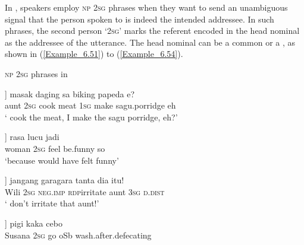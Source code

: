 
In , speakers employ \textsc{np} \textsc{2sg}  phrases when they want to send an unambiguous signal that the person spoken to is indeed the intended addressee. In such  phrases, the second person  ‘\textsc{2sg}’ marks the referent encoded in the head nominal as the addressee of the utterance. The head nominal can be a common  or a , as shown in (\ref{Example_6.51}) to (\ref{Example_6.54}).



\begin{styleExampleTitle}
\textsc{np} \textsc{2sg}  phrases in 
\end{styleExampleTitle}

\ea
\label{Example_6.51}
\gll {[\bluebold{mama-ade}} {]} {masak} {daging} {sa} {biking} {papeda} {e?}\\ %
 aunt  \textsc{2sg}  cook  meat  \textsc{1sg}  make  sagu.porridge  eh\\

\glt
‘ cook the meat, I make the sagu porridge, eh?’ \textstyleExampleSource{[080921-001-CvNP.0073]}
\z

\ea
\label{Example_6.52}
\gll {[\bluebold{mace}} {]} {rasa} {lucu} {jadi}\\ %
 woman  \textsc{2sg}  feel  be.funny  so\\

 ‘because  would have felt funny’ \textstyleExampleSource{[081010-001-Cv.0206]}
\z

\ea
\label{Example_6.53}
\gll {[\bluebold{Wili}} {]} {jangang} {gara{\Tilde}gara} {tanta} {dia} {itu}!\\ %
 Wili  \textsc{2sg}  \textsc{neg.imp}  \textsc{rdp}{\Tilde}irritate  aunt  \textsc{3sg}  \textsc{d.dist}\\

 ‘ don’t irritate that aunt!’ \textstyleExampleSource{[081023-001-Cv.0038]}
\z

\ea
\label{Example_6.54}
\gll {[\bluebold{Susana}} {]} {pigi} {kaka} {cebo}\\ %
 Susana  \textsc{2sg}  go  oSb  wash.after.defecating\\


